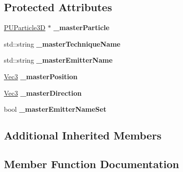 \subsection*{Protected Attributes}
\begin{DoxyCompactItemize}
\item 
\mbox{\label{classPUSlaveEmitter_a80feaa2a4a698a6337dbb1393d578d06}} 
\hyperlink{structPUParticle3D}{P\+U\+Particle3D} $\ast$ {\bfseries \+\_\+master\+Particle}
\item 
\mbox{\label{classPUSlaveEmitter_a1694aeee48445b861eb4c94795d6c929}} 
std\+::string {\bfseries \+\_\+master\+Technique\+Name}
\item 
\mbox{\label{classPUSlaveEmitter_a93b05b3ee4f57add45733c62f1abff0f}} 
std\+::string {\bfseries \+\_\+master\+Emitter\+Name}
\item 
\mbox{\label{classPUSlaveEmitter_affbc0522b34601afc3aa64b2157dd23c}} 
\hyperlink{classVec3}{Vec3} {\bfseries \+\_\+master\+Position}
\item 
\mbox{\label{classPUSlaveEmitter_a7a212522ace279157f44fb1cf459527c}} 
\hyperlink{classVec3}{Vec3} {\bfseries \+\_\+master\+Direction}
\item 
\mbox{\label{classPUSlaveEmitter_a1dec1846a18cbf2b02ab2b8fe65f2cb0}} 
bool {\bfseries \+\_\+master\+Emitter\+Name\+Set}
\end{DoxyCompactItemize}
\subsection*{Additional Inherited Members}


\subsection{Member Function Documentation}
\mbox{\label{classPUSlaveEmitter_ae52196734cc114bcd5293f9489c167ba}} 
